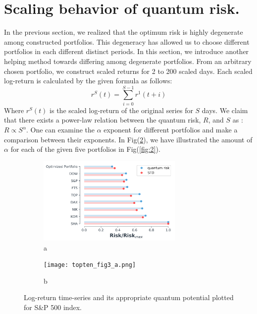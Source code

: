 \documentclass[ aip,jmp,reprint]{revtex4-2}
\begin{document}
\section{Scaling behavior of quantum risk.}
In the previous section, we realized that the optimum risk is highly degenerate among constructed portfolios. This degeneracy has allowed us to choose different portfolios in each different distinct periods. In this section, we introduce another helping method towards differing among degenerate portfolios. From an arbitrary chosen portfolio, we construct scaled returns for 2 to 200 scaled days. Each scaled log-return is calculated by the given formula as follows:
\begin{equation}
r^S(t) = \sum_{i=0}^{S-1} r^1(t+i)
\end{equation}
Where $r^S(t)$ is the scaled log-return of the original series for $S$ days. We claim that there exists a power-law relation between the quantum risk, $R$, and $S$ as : $R\propto S^{\alpha}$. One can examine the $\alpha$ exponent for different portfolios and make a comparison between their exponents. In Fig(\ref{fig3:sub1}), we have illustrated the amount of $\alpha$ for each of the given five portfolios in Fig(\ref{fig:2}). 
\begin{figure}[htb]
		\begin{subfigure}{0.49\textwidth}
		\centering
		\includegraphics[width=70mm]{fig1.png}
		\caption{a}
		\label{fig3:sub2}
	\end{subfigure}
		\begin{subfigure}{0.49\textwidth}
		\centering
		\texttt{[image: topten\_fig3\_a.png]}
		\caption{b}
		\label{fig3:sub1}
	\end{subfigure}
	\caption{Log-return time-series and its appropriate quantum potential plotted for S\&P 500 index.}
	\label{fig:3}
\end{figure}
 
\end{document}

